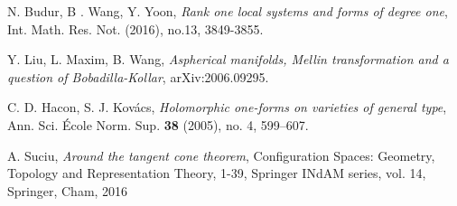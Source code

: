 \documentclass[11pt,reqno]{amsart}
\theoremstyle{definition}
\theoremstyle{remark}
\theoremstyle{cited}
\theoremstyle{citeddef}
\begin{document}
\begin{thebibliography}{ADMSP}



 N. Budur, B . Wang, Y. Yoon, {\it Rank one local systems and forms of degree one}, Int. Math. Res. Not. (2016), no.13, 3849-3855.


 Y. Liu, L. Maxim, B. Wang, \textit{Aspherical manifolds, Mellin transformation and a question of Bobadilla-Kollar}, arXiv:2006.09295.

 C. D. Hacon, S. J. Kov\'acs, \textit{Holomorphic one-forms on varieties of general type}, Ann. Sci. \'Ecole Norm. Sup. \textbf{38} (2005), no. 4, 599--607.


 A. Suciu, {\it Around the tangent cone theorem}, Configuration Spaces: Geometry, Topology and Representation Theory, 1-39, Springer INdAM series, vol. 14, Springer, Cham, 2016




\end{thebibliography}



\end{document}
